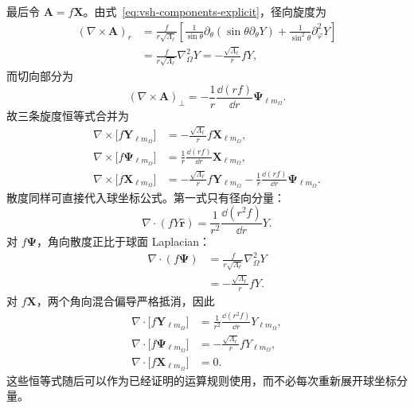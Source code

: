 最后令 $\bm A=f\bm X$。由式~\eqref{eq:vsh-components-explicit}，径向旋度为
\begin{align}
(\nabla\times\bm A)_r
&=\frac{f}{r\sqrt{\Lambda_\ell}}
\left[
\frac{1}{\sin\theta}\partial_\theta(\sin\theta\partial_\theta Y)
+\frac{1}{\sin^2\theta}\partial_\varphi^2Y
\right]\\
&=\frac{f}{r\sqrt{\Lambda_\ell}}\nabla_\Omega^2Y
=-\frac{\sqrt{\Lambda_\ell}}{r}fY,
\end{align}
而切向部分为
\begin{equation}
(\nabla\times\bm A)_\perp
=-\frac{1}{r}\frac{\dd(rf)}{\dd r}\bm\Psi_{\ell m_\Omega}.
\end{equation}
故三条旋度恒等式合并为
\begin{align}
\nabla\times\bigl[f\bm Y_{\ell m_{\Omega}}\bigr]
&=-\frac{\sqrt{\Lambda_\ell}}{r}f\bm X_{\ell m_{\Omega}},
\\
\nabla\times\bigl[f\bm\Psi_{\ell m_{\Omega}}\bigr]
&=\frac{1}{r}\frac{\dd(rf)}{\dd r}\bm X_{\ell m_{\Omega}},
\\
\nabla\times\bigl[f\bm X_{\ell m_{\Omega}}\bigr]
&=-\frac{\sqrt{\Lambda_\ell}}{r}f\bm Y_{\ell m_{\Omega}}
-\frac{1}{r}\frac{\dd(rf)}{\dd r}\bm\Psi_{\ell m_{\Omega}}.
\label{eq:vsh-curl-identities}
\end{align}
散度同样可直接代入球坐标公式。第一式只有径向分量：
\begin{equation}
\nabla\cdot(fY\hat{\bm r})
=\frac{1}{r^2}\frac{\dd(r^2f)}{\dd r}Y.
\end{equation}
对 $f\bm\Psi$，角向散度正比于球面 Laplacian：
\begin{align}
\nabla\cdot(f\bm\Psi)
&=\frac{f}{r\sqrt{\Lambda_\ell}}\nabla_\Omega^2Y\\
&=-\frac{\sqrt{\Lambda_\ell}}{r}fY.
\end{align}
对 $f\bm X$，两个角向混合偏导严格抵消，因此
\begin{align}
\nabla\cdot\bigl[f\bm Y_{\ell m_{\Omega}}\bigr]
&=\frac{1}{r^2}\frac{\dd(r^2f)}{\dd r}Y_{\ell m_{\Omega}},\\
\nabla\cdot\bigl[f\bm\Psi_{\ell m_{\Omega}}\bigr]
&=-\frac{\sqrt{\Lambda_\ell}}{r}fY_{\ell m_{\Omega}},\\
\nabla\cdot\bigl[f\bm X_{\ell m_{\Omega}}\bigr]
&=0.
\label{eq:vsh-div-identities}
\end{align}
这些恒等式随后可以作为已经证明的运算规则使用，而不必每次重新展开球坐标分量。

